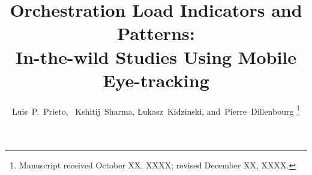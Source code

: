 \documentclass[10pt,journal,compsoc]{IEEEtran}
\begin{document}
%
\title{Orchestration Load Indicators and Patterns:\\In-the-wild Studies Using Mobile Eye-tracking}
%
%
%
%

\author{Luis~P.~Prieto,~
        Kshitij~Sharma,
        {\L}ukasz~Kidzinski,
        and~Pierre~Dillenbourg%
\thanks{Manuscript received October XX, XXXX; revised December XX, XXXX.}}
\end{document}
